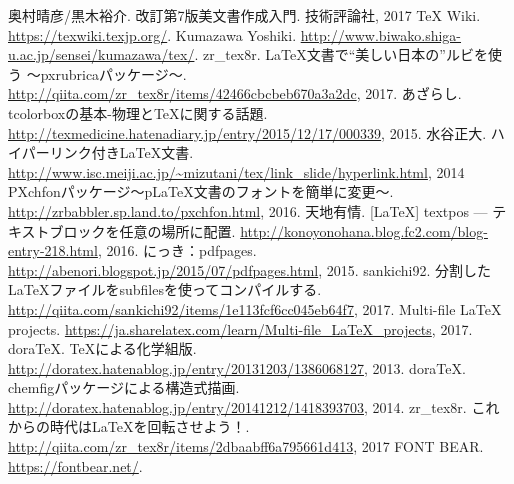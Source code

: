 
\begin{thebibliography}{99}
	奥村晴彦/黒木裕介.
	改訂第7版{\LaTeXe}美文書作成入門.
	技術評論社, 2017
	{\TeX} Wiki.
	\href{https://texwiki.texjp.org/}{https://texwiki.texjp.org/}.
	Kumazawa Yoshiki.
	\href{http://www.biwako.shiga-u.ac.jp/sensei/kumazawa/tex/}{http://www.biwako.shiga-u.ac.jp/sensei/kumazawa/tex/}.
	zr{\_}tex8r.
	LaTeX文書で“美しい日本の”ルビを使う ～pxrubricaパッケージ～.
	\href{http://qiita.com/zr_tex8r/items/42466cbcbeb670a3a2dc}{\url{http://qiita.com/zr_tex8r/items/42466cbcbeb670a3a2dc}}, 2017.
	あざらし.
	tcolorboxの基本-物理とTeXに関する話題.
	\href{http://texmedicine.hatenadiary.jp/entry/2015/12/17/000339}{http://texmedicine.hatenadiary.jp/entry/2015/12/17/000339}, 2015.
	水谷正大.
	ハイパーリンク付きLaTeX文書.
	\href{http://www.isc.meiji.ac.jp/~mizutani/tex/link_slide/hyperlink.html}{\url{http://www.isc.meiji.ac.jp/~mizutani/tex/link_slide/hyperlink.html}}, 2014
	PXchfonパッケージ～pLaTeX文書のフォントを簡単に変更～.
	\href{http://zrbabbler.sp.land.to/pxchfon.html}{http://zrbabbler.sp.land.to/pxchfon.html}, 2016.
	天地有情.
	[LaTeX] textpos --- テキストブロックを任意の場所に配置.
	\href{http://konoyonohana.blog.fc2.com/blog-entry-218.html}{http://konoyonohana.blog.fc2.com/blog-entry-218.html}, 2016.
	にっき：pdfpages.
	\href{http://abenori.blogspot.jp/2015/07/pdfpages.html}{http://abenori.blogspot.jp/2015/07/pdfpages.html}, 2015.
	sankichi92.
	分割したLaTeXファイルをsubfilesを使ってコンパイルする.
	\href{http://qiita.com/sankichi92/items/1e113fcf6cc045eb64f7}{http://qiita.com/sankichi92/items/1e113fcf6cc045eb64f7}, 2017.
	Multi-file LaTeX projects.
	\href{https://ja.sharelatex.com/learn/Multi-file_LaTeX_projects}{\url{https://ja.sharelatex.com/learn/Multi-file_LaTeX_projects}}, 2017.
	doraTeX.
	TeXによる化学組版.
	\href{http://doratex.hatenablog.jp/entry/20131203/1386068127}{http://doratex.hatenablog.jp/entry/20131203/1386068127}, 2013.
	doraTeX.
	chemfigパッケージによる構造式描画.
	\href{http://doratex.hatenablog.jp/entry/20141212/1418393703}{http://doratex.hatenablog.jp/entry/20141212/1418393703}, 2014.
	zr{\_}tex8r.
	これからの時代はLaTeXを回転させよう！.
	\href{http://qiita.com/zr_tex8r/items/2dbaabff6a795661d413}{\url{http://qiita.com/zr_tex8r/items/2dbaabff6a795661d413}}, 2017
	FONT BEAR.
	\href{https://fontbear.net/}{https://fontbear.net/}.
\end{thebibliography}


